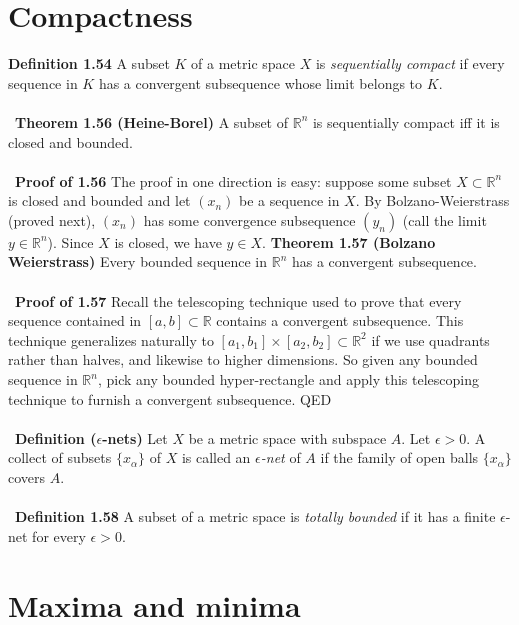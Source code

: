 \documentclass[12 pt]{article}
\newcommand{\R}{\mathbb{R}}
\numberwithin{equation}{section}
\begin{document}
{\section{Compactness}


\textbf{Definition 1.54} A subset $K$ of a metric space $X$ is \textit{sequentially compact} if every sequence in $K$ has a convergent subsequence whose limit belongs to $K$.\\
\\
\
\textbf{Theorem 1.56 (Heine-Borel)} A subset of $\R^n$ is sequentially compact iff it is closed and bounded.\\
\\
\
\textbf{Proof of 1.56} The proof in one direction is easy: suppose some subset $X \subset \R^n$ is closed and bounded and let $(x_n)$ be a sequence in $X$. By Bolzano-Weierstrass (proved next), $(x_n)$ has some convergence subsequence $(y_n)$ (call the limit $y \in \R^n$). Since $X$ is closed, we have $y \in X$.
\textbf{Theorem 1.57 (Bolzano Weierstrass)} Every bounded sequence in $\R^n$ has a convergent subsequence.\\
\\
\
\textbf{Proof of 1.57} Recall the telescoping technique used to prove that every sequence contained in $[a,b] \subset \R$ contains a convergent subsequence. This technique generalizes naturally to $[a_1, b_1] \times [a_2, b_2] \subset \R^2$ if we use quadrants rather than halves, and likewise to higher dimensions. So given any bounded sequence in $\R^n$, pick any bounded hyper-rectangle and apply this telescoping technique to furnish a convergent subsequence. QED\\
\\
\
\textbf{Definition ($\epsilon$-nets)} Let $X$ be a metric space with subspace $A$. Let $\epsilon > 0$. A collect of subsets $\{x_\alpha \}$ of $X$ is called an \textit{$\epsilon$-net} of $A$ if the family of open balls $\{x_\alpha\}$ covers $A$. \\
\\
\
\textbf{Definition 1.58} A subset of a metric space is \textit{totally bounded} if it has a finite $\epsilon$-net for every $\epsilon>0$.















\section{Maxima and minima}
















}
\end{document}
